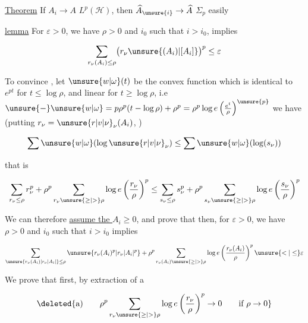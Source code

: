\uline{Theorem} If $A_i\to A$  $L^p(\mathscr H)$, then $\widehat A_{\unsure{i}}\to\widehat A$  $\Sigma_p$
 easily 

\uline{lemma} For  $\varepsilon>0$, we have $\rho>0$ and $i_0$ such that $i>i_0$, implies

\[
\sum_{r_\nu(A_i)\leq\rho}\bigl(r_\nu\unsure{(A_i)|[A_i]}\bigr)^p\leq\varepsilon
\]

To convince , let $\unsure{w|\omega}(t)$ be the convex function which is identical to $e^{pt}$ for $t\leq\log\rho$, and linear for $t\geq\log\rho$, i.e $\unsure{-}\unsure{w|\omega}=p\rho^p(t-\log\rho)+\rho^p=\rho^p\log e\left(\frac{e^t}{\rho}\right)^{\unsure{p}}$ we have (putting $r_\nu=\unsure{r|v|\nu}_\nu(A_i)$, )


\[
\sum \unsure{w|\omega}(\log\unsure{r|v|\nu}_\nu)\leq\sum \unsure{w|\omega}(\log(s_\nu))
\]

that is

\[
\sum_{r_\nu\leq\rho}r_\nu^p+\rho^p\sum_{r_\nu\unsure{\geq|>}\rho}\log e\left(\frac{r_\nu}{\rho}\right)^p
\leq\sum_{s_\nu\leq\rho}s_\nu^p+\rho^p\sum_{s_\nu\unsure{\geq|>}\rho}\log e\left(\frac{s_\nu}{\rho}\right)^p
\]

We can therefore \uline{assume the $A_i\geq0$},  and prove that then, for  $\varepsilon>0$, we have $\rho>0$ and $i_0$ such that $i>i_0$ implies

\[
\sum_{\unsure{r_\nu(A_i)|r_\nu\lvert A_i\rvert}\leq\rho}\unsure{r_\nu(A_i)^p|r_\nu\lvert A_i\rvert^p}
+\rho^p\sum_{r_\nu(A_i)\unsure{\geq|>}\rho}\log e\left(\frac{r_\nu(A_i)}{\rho}\right)^p\unsure{<|\leq}\varepsilon
\]

We prove that first, by extraction of a 


\[
\deleted{\text{a)}\qquad\rho^p\sum_{r_\nu\unsure{\geq|>}\rho}\log e\left(\frac{r_\nu}{\rho}\right)^p\to0\qquad\text{if }\rho\to0}
\]

